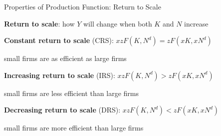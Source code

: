 \documentclass[11pt,aspectratio=169,usenames,dvipsnames]{beamer}
\let\tempone\itemize
\let\temptwo\enditemize
\renewenvironment{itemize}{\tempone\addtolength{\itemsep}{\fill}}{\temptwo}
\begin{document}
\begin{frame}{Properties of Production Function: Return to Scale}
\label{slide:Properties_of_Production_Function__Return_to_Scale}
    \begin{itemize}
        \item \textbf{Return to scale}: how $ Y $ will change when both $ K $ and $ N $ increase
        \item \textbf{Constant return to scale} (CRS): $ x z F( K, N^{d} ) = z F( xK, xN^{d} ) $
        \begin{itemize}
            \item small firms are \alert{as efficient as} large firms
        \end{itemize}
        \item \textbf{Increasing return to scale} (IRS): $ x z F( K, N^{d} ) > z F( xK, xN^{d} ) $
        \begin{itemize}
            \item small firms are \alert{less efficient than} large firms
        \end{itemize}
        \item \textbf{Decreasing return to scale} (DRS): $ x z F( K, N^{d} ) < z F( xK, xN^{d} ) $
        \begin{itemize}
            \item small firms are \alert{more efficient than} large firms
        \end{itemize}
    \end{itemize}
\end{frame}
\end{document}
